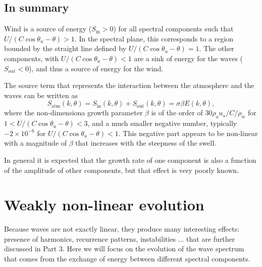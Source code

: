 \subsection{In summary}
Wind is a source of energy  ($S_{\mathrm{in}} > 0$) for all spectral components 
such that  $U/(C \cos \theta_u - \theta) > 1$. 
In the spectral plane, this corresponds to a region bounded by the straight line defined by $U/(C \cos \theta_u - \theta) = 1$. 
The other components, with $U/(C \cos \theta_u - \theta) < 1$ are a sink of energy for the waves  ($S_{out} < 0$), and thus a source of energy for the wind. 

The source term that represents the interaction between the atmosphere and the waves can be written as 
\begin{equation}
S_{\mathrm{atm}}(k,\theta)=S_{\mathrm{in}}(k,\theta)+S_{\mathrm{out}}(k,\theta) = \sigma \beta E(k,\theta),
\end{equation}
where the non-dimensiona growth parameter $\beta$ is of the order of $30 \rho_a u_\star / C / \rho_w$ for $1 < U/(C \cos \theta_u - \theta) < 3$, 
and a much smaller negative number, typically $-2 \times 10^{-6}$ for  $U/(C \cos \theta_u - \theta) < 1$. This negative 
part appears to be non-linear with a magnitude of $\beta$ that increases with the steepness of the swell. 

In general it is expected that the growth rate of one component is also a function of the amplitude of other components, but that effect is very poorly 
known.

\section{Weakly non-linear evolution}
Because waves are not exactly linear, 
they produce many interesting effects: presence of harmonics, recurrence patterns, instabilities ... that are further discussed in Part 3. Here we will focus on the evolution of the wave spectrum that comes from the exchange of 
energy between different spectral components. 

